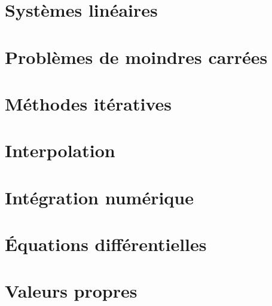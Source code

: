\section{Systèmes linéaires}


\section{Problèmes de moindres carrées}


\section{Méthodes itératives}


\section{Interpolation}


\section{Intégration numérique}


\section{Équations différentielles}


\section{Valeurs propres}
